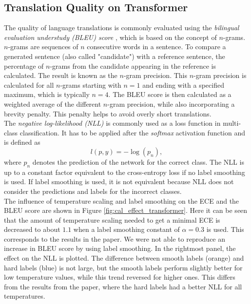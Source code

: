 \subsection{Translation Quality on Transformer}
The quality of language translations is commonly evaluated using the \textit{bilingual evaluation understudy (BLEU) score} \cite{papineni2002}, which is based on the concept of $n$-grams. $n$-grams are sequences of $n$ consecutive words in a sentence. To compare a generated sentence (also called "candidate") with a reference sentence, the percentage of $n$-grams from the candidate appearing in the reference is calculated. The result is known as the $n$-gram precision. This $n$-gram precision is calculated for all $n$-grams starting with $n = 1$ and ending with a specified maximum, which is typically $n = 4$. The BLEU score is then calculated as a weighted average of the different $n$-gram precision, while also incorporating a brevity penalty. This penalty helps to avoid overly short translations.\\

The \textit{negative log-likelihood (NLL)} is commonly used as a loss function in multi-class classification. It has to be applied after the \textit{softmax} activation function and is defined as
$$l(p, y) = -\log(p_n),$$
where $p_n$ denotes the prediction of the network for the correct class.
The NLL is up to a constant factor equivalent to the cross-entropy loss if no label smoothing is used. If label smoothing is used, it is not equivalent because NLL does not consider the predictions and labels for the incorrect classes.\\

The influence of temperature scaling and label smoothing on the ECE and the BLEU score are shown in Figure \ref{fig:cal_effect_transformer}. Here it can be seen that the amount of temperature scaling needed to get a minimal ECE is decreased to about $1.1$ when a label smoothing constant of $\alpha = 0.3$ is used. This corresponds to the results in the paper. We were not able to reproduce an increase in BLEU score by using label smoothing. In the rightmost panel, the effect on the NLL is plotted. The difference between smooth labels (orange) and hard labels (blue) is not large, but the smooth labels perform slightly better for low temperature values, while this trend reversed for higher ones. This differs from the results from the paper, where the hard labels had a better NLL for all temperatures.

